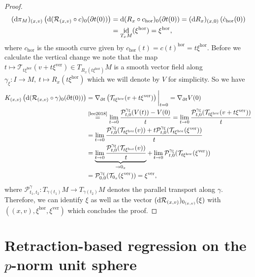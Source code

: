 \documentclass[11pt,a4paper]{article}
\theoremstyle{plain}
\theoremstyle{definition}
\DeclareMathOperator{\id}{id}
\newcommand{\hor}{\operatorname{hor}}
\newcommand{\ver}{\operatorname{ver}}
\begin{document}
\begin{proof}
\begin{align*}
		(\textup{d}\pi_M)_{(x, v)}\left(\textup{d}(\mathcal{R}_{(x, v)}\circ c)_0(\partial t(0))\right)
		&= \textup{d}(R_x\circ c_{\hor})_0(\partial t(0))
		= (\textup{d}R_x)_{(x, 0)}\left(\dot{c}_{\hor}(0)\right) \\
		&= \id_{T_xM}(\xi^{\hor})
		= \xi^{\hor},
	\end{align*}
	where $c_{\hor}$ is the smooth curve given by $c_{\hor}(t) = c(t)^{\hor} = t \xi^{\hor}$.
	Before we calculate the vertical change we note that the map $t\mapsto \mathcal{T}_{t\xi^{\hor}}(v + t \xi^{\ver}) \in T_{R_x(t\xi^{\hor})}M$ is a smooth vector field along $\gamma_{\xi}\colon I\to M,\
	t\mapsto R_x\left(t \xi^{\hor}\right)$ which we will denote by $V$ for simplicity. So we have 
	\begin{align*}
		K_{(x, v)}\left(\textup{d}(\mathcal{R}_{(x, v)}\circ \gamma)_0(\partial t(0))\right)
		&= \nabla_{\partial t} \left(\mathcal{T}_{t\xi^{\hor}}(v + t \xi^{\ver})\right)\bigg|_{t = 0} 
		= \nabla_{\partial t} V(0) \\
		&\overset{\text{\cite{lee2018}}}{=} \lim\limits_{t\to 0} \frac{\mathcal{P}_{t, 0}^{\gamma_{\xi}}(V(t)) - V(0)}{t} 
		= \lim\limits_{t\to 0} \frac{\mathcal{P}_{t, 0}^{\gamma_{\xi}}(\mathcal{T}_{t\xi^{\hor}}(v + t \xi^{\ver}))}{t} \\
		&= \lim\limits_{t\to 0} \frac{\mathcal{P}_{t, 0}^{\gamma_{\xi}}(\mathcal{T}_{t\xi^{\hor}}(v)) + t \mathcal{P}_{t, 0}^{\gamma_{\xi}}(\mathcal{T}_{t\xi^{\hor}}(\xi^{\ver}))}{t} \\
		&= \underbrace{\lim\limits_{t\to 0} \frac{\mathcal{P}_{t, 0}^{\gamma_{\xi}}(\mathcal{T}_{t\xi^{\hor}}(v))}{t}}_{\to 0_x}
		+ \lim\limits_{t\to 0}\mathcal{P}_{t, 0}^{\gamma_{\xi}}(\mathcal{T}_{t\xi^{\hor}}(\xi^{\ver})) \\
		&= \mathcal{P}_{0, 0}^{\gamma_{\xi}}(\mathcal{T}_{0_x}(\xi^{\ver})) 
		= \xi^{\ver},
	\end{align*}
	where $\mathcal{P}^{\gamma}_{t_1, t_2}\colon T_{\gamma(t_1)}M\to T_{\gamma(t_2)}M$ denotes the parallel transport along $\gamma$. Therefore, we can identify $\xi$ as well as the vector $(\textup{d}\mathcal{R}_{(x, v)})_{0_{(x, v)}}(\xi)$ with $((x, v), \xi^{\hor}, \xi^{\ver})$ which concludes the proof.
\end{proof}

\section{Retraction-based regression on the $p$-norm unit sphere}
\label{sec:numerics}
\end{document}
